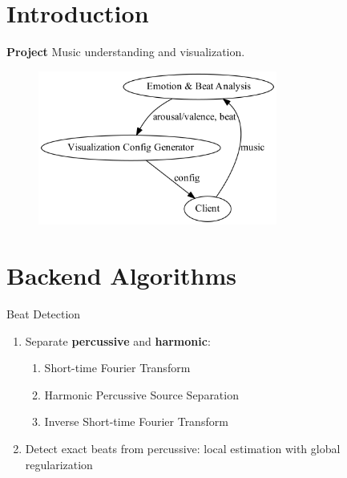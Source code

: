 
\section{Introduction}
\begin{frame}
\begin{exampleblock}{\textbf{Project}}
Music understanding and visualization.
\end{exampleblock}

\begin{figure}[H]
  \centering
  \includegraphics[width=0.7\textwidth]{res/illu.dot.png}
\end{figure}


\end{frame}

\section{Backend Algorithms}
\begin{frame}{Beat Detection}
\begin{enumerate}
    \item Separate \textbf{percussive} and \textbf{harmonic}:
      \begin{enumerate}
        \item Short-time Fourier Transform
        \item Harmonic Percussive Source Separation
        \item Inverse Short-time Fourier Transform
      \end{enumerate}
    \item Detect exact beats from percussive: local estimation with global regularization
  \end{enumerate}
\end{frame}

